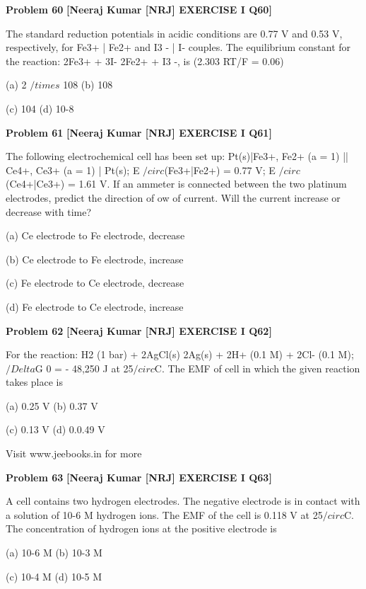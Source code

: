 \begin{problembox}
\textbf{Problem 60} \hfill \textbf{[Neeraj Kumar [NRJ] EXERCISE I Q60]}
\label{q:ext-nrj_all_questions-60}

The standard reduction potentials in acidic 
conditions are 0.77 V and 0.53 V, respectively, for 
Fe3+ | Fe2+ and I3
- | I- couples. The equilibrium 
constant for the reaction: 2Fe3+ + 3I-   2Fe2+ + 
I3
-, is (2.303 RT/F = 0.06)
 
 (a) 2 $/times$ 108 
(b) 108
 
 (c) 104 
(d) 10-8
\end{problembox}

\begin{problembox}
\textbf{Problem 61} \hfill \textbf{[Neeraj Kumar [NRJ] EXERCISE I Q61]}
\label{q:ext-nrj_all_questions-61}

The following electrochemical cell has been set up: 
Pt(s)|Fe3+, Fe2+ (a = 1) || Ce4+, Ce3+ (a = 1) | Pt(s); 
E $/circ$(Fe3+|Fe2+) = 0.77 V; E $/circ$ (Ce4+|Ce3+) = 1.61 V. 
If an ammeter is connected between the two 
platinum electrodes, predict the direction of   ow 
of current. Will the current increase or decrease 
with time?
 
 (a) Ce electrode to Fe electrode, decrease
 
 (b) Ce electrode to Fe electrode, increase
 
 (c) Fe electrode to Ce electrode, decrease
 
 (d) Fe electrode to Ce electrode, increase
\end{problembox}

\begin{problembox}
\textbf{Problem 62} \hfill \textbf{[Neeraj Kumar [NRJ] EXERCISE I Q62]}
\label{q:ext-nrj_all_questions-62}

For the reaction: H2 (1 bar) + 2AgCl(s)   2Ag(s) 
+ 2H+ (0.1 M) + 2Cl- (0.1 M); $/Delta$G  0 = - 48,250 J at 
25$/circ$C. The EMF of cell in which the given reaction 
takes place is
 
 (a) 0.25 V 
(b) 0.37 V
 
 (c) 0.13 V 
(d) 0.0.49 V
 
 
Visit www.jeebooks.in for more
\end{problembox}

\begin{problembox}
\textbf{Problem 63} \hfill \textbf{[Neeraj Kumar [NRJ] EXERCISE I Q63]}
\label{q:ext-nrj_all_questions-63}

A cell contains two hydrogen  electrodes. The 
negative electrode is in contact with a solution 
of 10-6 M hydrogen ions. The EMF of the cell is 
0.118 V at 25$/circ$C. The concentration of hydrogen 
ions at the positive electrode is
 
 (a) 10-6 M 
(b) 10-3 M
 
 (c) 10-4 M 
(d) 10-5 M
\end{problembox}

